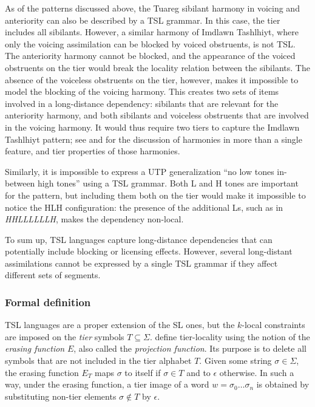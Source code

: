 As of the patterns discussed above, the Tuareg sibilant harmony in voicing and anteriority can also be described by a TSL grammar.
In this case, the tier includes all sibilants.
However, a similar harmony of Imdlawn Tashlhiyt, where only the voicing assimilation can be blocked by voiced obstruents, is not TSL.
The anteriority harmony cannot be blocked, and the appearance of the voiced obstruents on the tier would break the locality relation between the sibilants.
The absence of the voiceless obstruents on the tier, however, makes it impossible to model the blocking of the voicing harmony.
This creates two sets of items involved in a long-distance dependency: sibilants that are relevant for the anteriority harmony, and both sibilants and voiceless obstruents that are involved in the voicing harmony.
It would thus require two tiers to capture the Imdlawn Tashlhiyt pattern; see \cite{McMullin2016} and \cite{AksenovaDeshmukh2018} for the discussion of harmonies in more than a single feature, and tier properties of those harmonies.

Similarly, it is impossible to express a UTP generalization ``no low tones in-between high tones'' using a TSL grammar.
Both L and H tones are important for the pattern, but including them both on the tier would make it impossible to notice the HLH configuration: the presence of the additional Ls, such as in \emph{HHLLLLLLH}, makes the dependency non-local.


To sum up, TSL languages capture long-distance dependencies that can potentially include blocking or licensing effects.
However, several long-distant assimilations cannot be expressed by a single TSL grammar if they affect different sets of segments.

\subsubsection{Formal definition}

TSL languages are a proper extension of the SL ones, but the $k$-local constraints are imposed on the \emph{tier} symbols $T \subseteq \Sigma$.
\cite{DeSantoGraf19FG} define tier-locality using the notion of the \emph{erasing function} $E$, also called the \emph{projection function}.
Its purpose is to delete all symbols that are not included in the tier alphabet $T$.
Given some string $\sigma \in \Sigma$, the erasing function $E_{T}$ maps $\sigma$ to itself if $\sigma \in T$ and to $\epsilon$ otherwise.
In such a way, under the erasing function, a tier image of a word $w = \sigma_0\dots\sigma_n$ is obtained by substituting non-tier elements $\sigma \not\in T$ by $\epsilon$.


